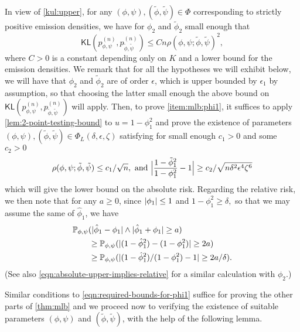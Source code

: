 \documentclass[journal]{IEEEtran}
\newcommand{\1}{\boldsymbol{1}}
\newcommand{\PP}{\mathbb{P}}
\newcommand{\KL}{\mathsf{KL}}
\DeclarePairedDelimiter{\abs}{\lvert}{\rvert}
\begin{document}
In view of  %
\cref{kul:upper}, for any $(\phi,\psi),(\tilde{\phi},\tilde{\psi})\in\Phi$ corresponding to strictly positive emission densities, we have for $\phi_2$ and $\tilde{\phi}_2$ small enough that
\[ \KL(p_{\phi,\psi}^{(n)},p_{\tilde{\phi},\tilde{\psi}}^{(n)})\leq C n \rho(\phi,\psi;\tilde{\phi},\tilde{\psi})^2,\]
where $C>0$ is a constant depending only on $K$ and a lower bound for the emission densities. We remark that for all the hypotheses we will exhibit below, we will have that $\phi_2$ and $\tilde{\phi}_2$ are of order $\epsilon$, which is upper bounded by $\epsilon_1$ by assumption, so that choosing the latter small enough the above bound on $\KL(p_{\phi,\psi}^{(n)},p_{\tilde{\phi},\tilde{\psi}}^{(n)})$ will apply. Then, to prove \cref{item:mlb:phi1}, it suffices to apply \cref{lem:2-point-testing-bound} to $u=1-\phi_1^2$ and prove the existence of parameters $(\phi,\psi),(\tilde{\phi},\tilde{\psi})\in \Phi_L(\delta,\epsilon,\zeta)$ satisfying for small enough $c_1> 0$ and some $c_2 > 0$
\begin{equation} \label{eqn:required-bounds-for-phi1}\rho(\phi,\psi;\tilde{\phi},\tilde{\psi})\leq c_1/\sqrt{n},\ \text{and} \ %
  \abs[\Big]{\frac{1-\tilde{\phi}_1^2}{1-\phi_1^2}-1}\geq c_2/\sqrt{n\delta^2\epsilon^4\zeta^6}
\end{equation}
which will give the lower bound on the absolute risk. Regarding the relative risk, we then note that for any $a\geq 0$, since $\abs{\phi_1}\leq 1$ and $1-\phi_1^2\geq \delta,$ so that we may assume the same of $\hat{\phi}_1$, we have
\begin{align*}
  &\PP_{\phi,\psi}(\abs{\hat{\phi}_1-\phi_1}\wedge \abs{ \hat{\phi}_1+\phi_1 }\geq a)\\
  &\qquad\geq 	\PP_{\phi,\psi}(\abs{(1-\hat{\phi}_1^2)-(1-\phi_1^2)}\geq 2a) \\ &\qquad\geq \PP_{\phi,\psi}(\abs{(1-\hat{\phi}_1^2)/(1-\phi_1^2)-1}\geq 2a/\delta).
\end{align*}
(See also \cref{eqn:absolute-upper-implies-relative} for a similar calculation with $\phi_2$.)

Similar conditions to \eqref{eqn:required-bounds-for-phi1} suffice for proving the other parts of \cref{thm:mlb} and we proceed now to verifying the existence of suitable parameters $(\phi,\psi)$ and $(\tilde{\phi},\tilde{\psi})$, with the help of the following lemma.
\end{document}
